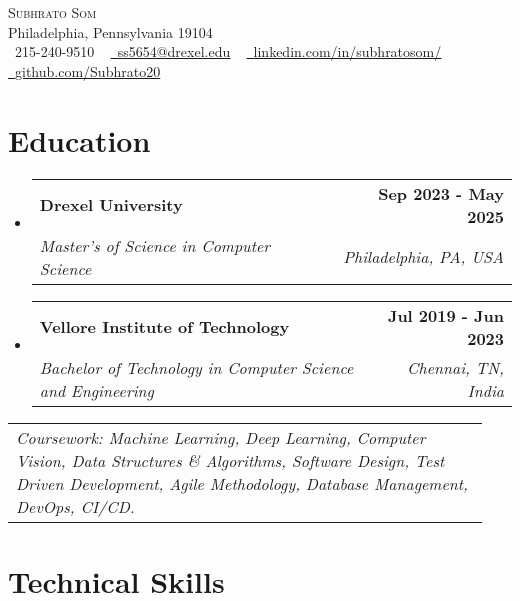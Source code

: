 \documentclass[letterpaper,11pt]{article}
\makeatletter
\newcommand{\resumeSubheading}[4]{
  \vspace{-2pt}\item
    \begin{tabular*}{1.0\textwidth}[t]{l@{\extracolsep{\fill}}r}
      \textbf{#1} & \textbf{\small #2} \\
      \textit{\small#3} & \textit{\small #4} \\
    \end{tabular*}\vspace{-7pt}
}
\newcommand{\resumeSubHeadingListStart}{\begin{itemize}[leftmargin=0.0in, label={}]}
\newcommand{\resumeSubHeadingListEnd}{\end{itemize}}
\makeatother
\begin{document}

\vspace{-16pt}
\begin{center}
    {\Huge \scshape Subhrato Som} \\ \vspace{1pt}
    Philadelphia, Pennsylvania 19104 \\ \vspace{1pt}
    \small \raisebox{-0.1\height}\faPhone\ 215-240-9510 ~ \href{mailto:ss5654@drexel.edu}{\raisebox{-0.2\height}\faEnvelope\  \underline{ss5654@drexel.edu}} ~ 
    \href{https://linkedin.com/in/subhratosom/}{\raisebox{-0.2\height}\faLinkedin\ \underline{linkedin.com/in/subhratosom/}}  ~
    \href{https://github.com/Subhrato20}{\raisebox{-0.2\height}\faGithub\ \underline{github.com/Subhrato20}}
    \vspace{-8pt}
\end{center}

\section{Education}
  \resumeSubHeadingListStart
  
    \resumeSubheading
      {Drexel University}{Sep 2023 - May 2025}
      {Master's of Science in Computer Science}{Philadelphia, PA, USA}

    \vspace{-5pt}
    \resumeSubheading
      {Vellore Institute of Technology}{Jul 2019 - Jun 2023}
      {Bachelor of Technology in Computer Science and Engineering}{Chennai, TN, India}
  
  \resumeSubHeadingListEnd
  \vspace{-6pt}
  \vspace{0.2em}
    \hspace{0.15in}\begin{tabular}{p{0.94\linewidth}}
    \textit{{Coursework}: Machine Learning, Deep Learning, Computer Vision, Data Structures \& Algorithms, Software Design, Test Driven Development, Agile Methodology, Database Management, DevOps, CI/CD.}
\end{tabular}
\vspace{-15pt}
\section{Technical Skills}
\end{document}
